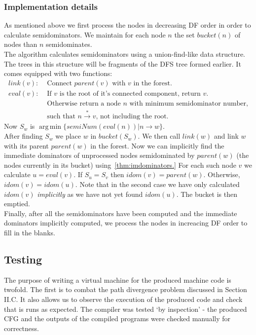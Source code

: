 \documentclass[12pt,a4paper]{article}
\DeclareMathOperator*{\argmin}{arg\,min}
\begin{document}
\subsubsection{Implementation details}
As mentioned above we first process the nodes in decreasing DF order in order to calculate semidominators. We maintain for each node $n$ the set $bucket(n)$ of nodes
than $n$ semidominates.\\
The algorithm calculates semidominators using a union-find-like data structure. The trees in this structure will be fragments of the DFS tree formed earlier. It comes equipped with two functions:
\begin{align*}
link(v): &\text{ Connect $parent(v)$ with $v$ in the forest.}\\
eval(v): &\text{ If $v$ is the root of it's connected component, return $v$.}\\
   &\text{ Otherwise return a node $n$ with minimum semidominator number,}\\
   &\text{ such that $n \xrightarrow{*} v$,  not including the root.}
\end{align*}
Now $S_w$ is $\argmin\{semiNum(eval(n)) |n \to w\}$.\\
 After finding $S_w$ we place $w$ in $bucket(S_w)$. We then call $link(w)$ and link $w$ with its parent $parent(w)$ in the forest. Now we can implicitly find the immediate dominators of unprocessed nodes semidominated by $parent(w)$ (the nodes currently in its bucket) using~\cref{thm:imdominators.} 
 For each such node $v$ we calculate $u = eval(v)$. If $S_u = S_v$ then $idom(v) = parent(w)$. Otherwise, $idom(v) = idom(u)$. Note that in the second case we have only calculated $idom(v)$ \textit{implicitly} as we have not yet found $idom(u)$. 
 The bucket is then emptied.\\
Finally, after all the semidominators have been computed and the immediate dominators implicitly computed, we process the nodes in increacing DF order to fill in the blanks.\par

\subsection{Testing}
The purpose of writing a virtual machine for the produced machine code is twofold. The first is to combat the path divergence problem discussed in Section II.C. %
It also allows us to observe the execution of the produced code and check that is runs as expected. The compiler was tested `by inspection' - the produced CFG and the
outputs of the compiled programs were checked manually for correctness.
\end{document}
